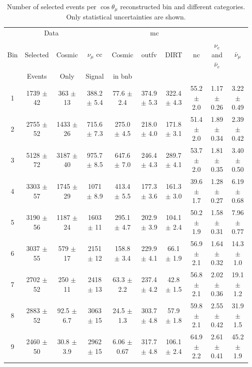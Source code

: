 \begin{table}[]
\scriptsize
\begin{adjustwidth}{-1.5cm}{-1cm}
\caption[Selected Events Per $\cos\theta_\mu$ Bin]{Number of selected events per $\cos\theta_\mu$ reconstructed bin and different categories. Only statistical uncertainties  are shown.}
\label{tab:costhetamu_events}
\centering
\begin{tabular}{c|cc|ccccccc}
\toprule
    & \multicolumn{2}{c}{Data}    & \multicolumn{6}{c}{\acrshort{mc}} \\
Bin & Selected & Cosmic & $\nu_\mu$ \acrshort{cc} & Cosmic  & \acrshort{outfv} & DIRT  & \acrshort{nc} & $\nu_e$ and $\bar{\nu}_e$ & $\bar{\nu}_\mu$ \\
    & Events   & Only   & Signal       & in \acrshort{bnb}  &       &       &    &                           &                 \\
\midrule
1 & 1739 $\pm$ 42 & 363 $\pm$ 13 & 388.2 $\pm$ 5.4 & 77.6 $\pm$ 2.4 & 374.9 $\pm$ 5.3 & 322.4 $\pm$ 4.3  & 55.2 $\pm$ 2.0 & 1.17 $\pm$ 0.26 & 3.22 $\pm$ 0.49 \\ 
2 & 2755 $\pm$ 52 & 1433 $\pm$ 26 & 715.6 $\pm$ 7.3 & 275.0 $\pm$ 4.5 & 218.0 $\pm$ 4.0 & 171.8 $\pm$ 3.1  & 51.4 $\pm$ 2.0 & 1.89 $\pm$ 0.34 & 2.39 $\pm$ 0.42 \\ 
3 & 5128 $\pm$ 72 & 3187 $\pm$ 40 & 975.7 $\pm$ 8.5 & 647.6 $\pm$ 7.0 & 246.4 $\pm$ 4.3 & 289.7 $\pm$ 4.1  & 53.7 $\pm$ 2.0 & 1.81 $\pm$ 0.35 & 3.40 $\pm$ 0.50 \\ 
4 & 3303 $\pm$ 57 & 1745 $\pm$ 29 & 1071 $\pm$ 8.9 & 413.4 $\pm$ 5.5 & 177.3 $\pm$ 3.6 & 161.3 $\pm$ 3.0 & 39.6 $\pm$ 1.7 & 1.28 $\pm$ 0.27 & 6.19 $\pm$ 0.68 \\ 
5 & 3190 $\pm$ 56 & 1187 $\pm$ 24 & 1603 $\pm$ 11 & 295.1 $\pm$ 4.7 & 202.9 $\pm$ 3.9 & 104.1 $\pm$ 2.4 & 50.2 $\pm$ 1.9  & 1.58 $\pm$ 0.31 & 7.96 $\pm$ 0.77 \\ 
6 & 3037 $\pm$ 55 & 579 $\pm$ 17 & 2151 $\pm$ 12 & 158.8 $\pm$ 3.4 & 229.9 $\pm$ 4.1 & 66.1 $\pm$ 1.9 & 56.9 $\pm$ 2.1   & 1.64 $\pm$ 0.32 & 14.3 $\pm$ 1.0 \\ 
7 & 2702 $\pm$ 52 & 250 $\pm$ 11 & 2418 $\pm$ 13 & 63.3 $\pm$ 2.2 & 237.4 $\pm$ 4.2 & 42.8 $\pm$ 1.5 & 56.8 $\pm$ 2.1    & 2.02 $\pm$ 0.36 & 19.1 $\pm$ 1.2 \\ 
8 & 2883 $\pm$ 52 & 92.5 $\pm$ 6.7 & 3063 $\pm$ 15 & 24.5 $\pm$ 1.3 & 303.7 $\pm$ 4.8 & 57.9 $\pm$ 1.8  & 59.8 $\pm$ 2.1  & 2.55 $\pm$ 0.42 & 31.9 $\pm$ 1.5 \\ 
9 & 2460 $\pm$ 50 & 30.8 $\pm$ 3.9 & 2962 $\pm$ 15 & 6.06 $\pm$ 0.67 & 317.7 $\pm$ 4.8 & 106.1 $\pm$ 2.4 & 64.9 $\pm$ 2.2 & 2.61 $\pm$ 0.41 & 45.2 $\pm$ 1.9 \\ 
\bottomrule
\end{tabular}
\end{adjustwidth}
\end{table}





